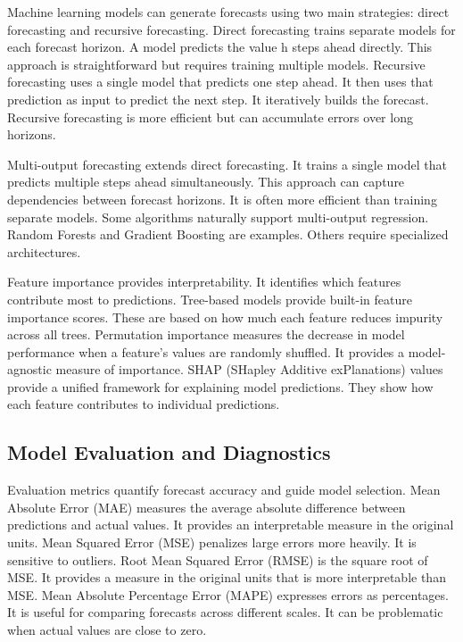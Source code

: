 Machine learning models can generate forecasts using two main strategies: direct forecasting and recursive forecasting. Direct forecasting trains separate models for each forecast horizon. A model predicts the value h steps ahead directly. This approach is straightforward but requires training multiple models. Recursive forecasting uses a single model that predicts one step ahead. It then uses that prediction as input to predict the next step. It iteratively builds the forecast. Recursive forecasting is more efficient but can accumulate errors over long horizons.

Multi-output forecasting extends direct forecasting. It trains a single model that predicts multiple steps ahead simultaneously. This approach can capture dependencies between forecast horizons. It is often more efficient than training separate models. Some algorithms naturally support multi-output regression. Random Forests and Gradient Boosting are examples. Others require specialized architectures.

Feature importance provides interpretability. It identifies which features contribute most to predictions. Tree-based models provide built-in feature importance scores. These are based on how much each feature reduces impurity across all trees. Permutation importance measures the decrease in model performance when a feature's values are randomly shuffled. It provides a model-agnostic measure of importance. SHAP (SHapley Additive exPlanations) values provide a unified framework for explaining model predictions. They show how each feature contributes to individual predictions.

\subsection{Model Evaluation and Diagnostics}

Evaluation metrics quantify forecast accuracy and guide model selection. Mean Absolute Error (MAE) measures the average absolute difference between predictions and actual values. It provides an interpretable measure in the original units. Mean Squared Error (MSE) penalizes large errors more heavily. It is sensitive to outliers. Root Mean Squared Error (RMSE) is the square root of MSE. It provides a measure in the original units that is more interpretable than MSE. Mean Absolute Percentage Error (MAPE) expresses errors as percentages. It is useful for comparing forecasts across different scales. It can be problematic when actual values are close to zero.

